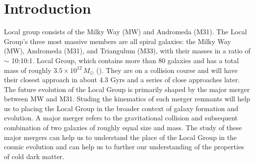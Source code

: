 \documentclass[twocolumn,linenumbers,trackchanges]{aastex7}
\begin{document}
\author{Suhani Surana}





\section{Introduction} 

Local group consists of the Milky Way (MW) and Andromeda (M31). The Local Group's three most massive members are all spiral galaxies: the Milky Way (MW), Andromeda (M31), and Triangulum (M33), with their masses in a ratio of \(\sim \) 10:10:1.  Local Group, which contains more
than 80 galaxies and has a total mass of roughly \( 3.5 \times 10^{12} \, M_\odot \)
(\cite{2014ApJ...793...91G}). They are on a collision course and will have their closest approach in about 4.3 Gyrs and a series of close approaches later. The future evolution of the Local Group is primarily shaped by the 
major merger between MW and M31.
Studing the kinematics of such merger remnants will help us to placing the Local Group in the broader context of galaxy formation and evolution.  A major merger refers to the gravitational collision and subsequent combination of two galaxies of roughly equal size and mass. The study of these major mergers can help us to understand the place of the Local Group in the cosmic evolution and can help us to further our understanding of the properties of cold dark matter.
\end{document}
